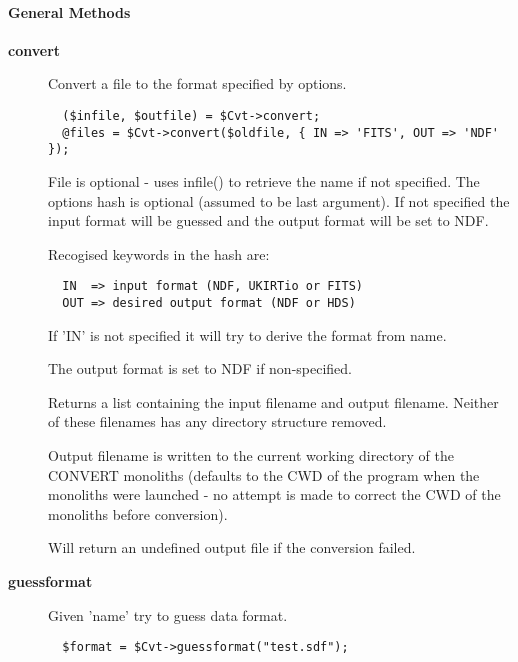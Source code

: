 \paragraph*{General Methods\label{ORAC::Convert_General_Methods}}
\begin{description}

\item[\textbf{convert}] \mbox{}

Convert a file to the format specified by options.

\begin{verbatim}
  ($infile, $outfile) = $Cvt->convert;
  @files = $Cvt->convert($oldfile, { IN => 'FITS', OUT => 'NDF' });
\end{verbatim}


File is optional - uses infile() to retrieve the name if not specified.
The options hash is optional (assumed to be last argument). If not
specified the input format will be guessed and the output format
will be set to NDF.



Recogised keywords in the hash are:

\begin{verbatim}
  IN  => input format (NDF, UKIRTio or FITS)
  OUT => desired output format (NDF or HDS)
\end{verbatim}


If 'IN' is not specified it will try to derive the format from
name.



The output format is set to NDF if non-specified.



Returns a list containing the input filename and output filename.
Neither of these filenames has any directory structure removed.



Output filename is written to the current working directory of the
CONVERT monoliths (defaults to the CWD of the program when the
monoliths were launched - no attempt is made to correct the
CWD of the monoliths before conversion).



Will return an undefined output file if the conversion failed.


\item[\textbf{guessformat}] \mbox{}

Given 'name' try to guess data format.

\begin{verbatim}
  $format = $Cvt->guessformat("test.sdf");
\end{verbatim}



\end{description}
